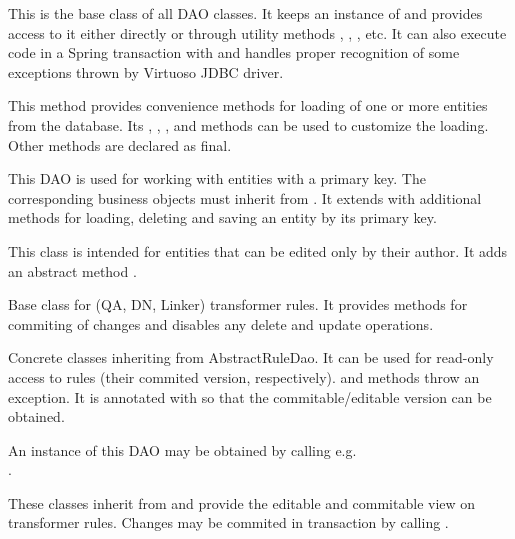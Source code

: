 \begin{description}[style=nextline,font=\ttfamily]
	\item[Dao] This is the base class of all DAO classes. It keeps an instance of  and provides access to it either directly or through utility methods , , , etc. It can also execute code in a Spring transaction with  and handles proper recognition of some exceptions thrown by Virtuoso JDBC driver.
	\item[DaoTemplate] This method provides convenience methods for loading of one or more entities from the database. Its , , ,  and  methods can be used to customize the loading. Other methods are declared as final.
	\item[DaoForEntityWithSurrogateKey] This DAO is used for working with entities with a primary key. The corresponding business objects must inherit from . It extends  with additional methods for loading, deleting and saving an entity by its primary key.
	\item[DaoForAuthorableEntity] This class is intended for entities that can be edited only by their author. It adds an abstract method .
	\item[AbstractRuleDao] Base class for (QA, DN, Linker) transformer rules. It provides methods for commiting of changes and disables any delete and update operations.
	\item[XXXRuleDao] Concrete classes inheriting from AbstractRuleDao. It can be used for read-only access to rules (their commited version, respectively).  and  methods throw an exception. It is annotated with  so that the commitable/editable version can be obtained.

		An instance of this DAO may be obtained by calling e.g.\\
		.
	\item[XXXRuleUncommittedDao] These classes inherit from  and provide the editable and commitable view on transformer rules. Changes may be commited in transaction by calling .


\end{description}

